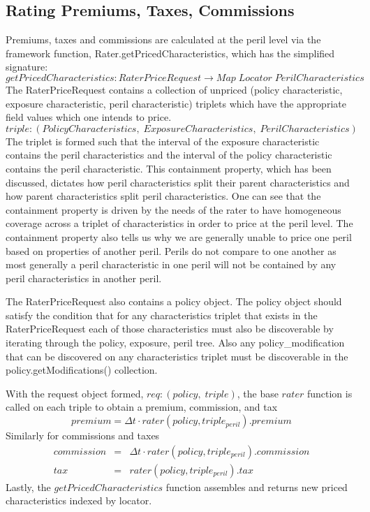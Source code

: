 \documentclass[a4paper,11pt]{article}
\begin{document}
\subsection{Rating Premiums, Taxes, Commissions}
Premiums, taxes and commissions are calculated at the peril level via the framework function, Rater.getPricedCharacteristics,
which has the simplified signature:
\begin{equation*}
  getPricedCharacteristics: RaterPriceRequest \to Map \; Locator \; PerilCharacteristics
\end{equation*}
The RaterPriceRequest contains a collection of unpriced (policy characteristic, exposure characteristic, peril characteristic) triplets
which have the appropriate field values which one intends to price.
\begin{equation*}
triple: (PolicyCharacteristics, \; ExposureCharacteristics, \; PerilCharacteristics)
\end{equation*}
The triplet is formed such that the interval of the
exposure characteristic contains the peril characteristics and the interval of the policy characteristic contains the
peril characteristic. This containment property, which has been discussed, dictates how peril characteristics split
their parent characteristics and how parent characteristics split peril characteristics. One can see that the containment property
is driven by the needs of the rater to have homogeneous coverage across a triplet of characteristics in order to price at the peril
level. The containment property also tells us why we are generally unable to price one peril based on properties of another peril.
Perils do not compare to one another as most generally a peril characteristic in one peril will not be contained by any
peril characteristics in another peril.

The RaterPriceRequest also contains a policy object. The policy object should satisfy the condition that for any
characteristics triplet that exists in the RaterPriceRequest each of those characteristics must also be discoverable by
iterating through the policy, exposure, peril tree. Also any policy\_modification that can be discovered on any
characteristics triplet must be discoverable in the policy.getModifications() collection.

With the request object formed, $req: (policy, \; triple)$, the base $rater$ function is called on each triple to obtain
a premium, commission, and tax
\begin{equation*}
premium = \Delta t \cdot rater(policy, triple_{peril}).premium
\end{equation*}
Similarly for commissions and taxes
\begin{eqnarray*}
commission & = & \Delta t \cdot rater(policy, triple_{peril}).commission \\
tax & = & rater(policy, triple_{peril}).tax
\end{eqnarray*}
Lastly, the $getPricedCharacteristics$ function assembles and returns new priced characteristics indexed by locator.
\end{document}
